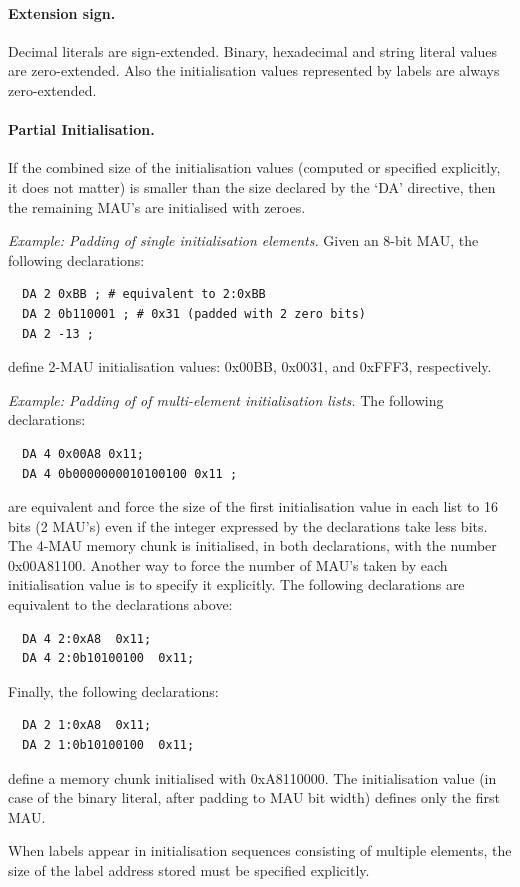 \documentclass[twoside]{tceusermanual}
\begin{document}
\paragraph{Extension sign.}
Decimal literals are sign-extended. Binary, hexadecimal and string literal
values are zero-extended. Also the initialisation values represented by
labels are always zero-extended.

\paragraph{Partial Initialisation.}
If the combined size of the initialisation values (computed or specified
explicitly, it does not matter) is smaller than the size declared by the `DA'
directive, then the remaining MAU's are initialised with zeroes.

\emph{Example: Padding of single initialisation elements.}
%
Given an 8-bit MAU, the following declarations:
\begin{verbatim}
  DA 2 0xBB ; # equivalent to 2:0xBB
  DA 2 0b110001 ; # 0x31 (padded with 2 zero bits)
  DA 2 -13 ;
\end{verbatim}
define 2-MAU initialisation values: 0x00BB, 0x0031, and 0xFFF3,
respectively.

\emph{Example: Padding of of multi-element initialisation lists.}
%
The following declarations:
\begin{verbatim}
  DA 4 0x00A8 0x11;
  DA 4 0b0000000010100100 0x11 ;
\end{verbatim}
are equivalent and force the size of the first initialisation value in each
list to 16 bits (2 MAU's) even if the integer expressed by the declarations
take less bits. The 4-MAU memory chunk is initialised, in both declarations,
with the number 0x00A81100.
%
Another way to force the number of MAU's taken by each initialisation value
is to specify it explicitly.
%
The following declarations are equivalent to the declarations above:
\begin{verbatim}
  DA 4 2:0xA8  0x11;
  DA 4 2:0b10100100  0x11;
\end{verbatim}
%
Finally, the following declarations:
\begin{verbatim}
  DA 2 1:0xA8  0x11;
  DA 2 1:0b10100100  0x11;
\end{verbatim}
define a memory chunk initialised with 0xA8110000. The initialisation value
(in case of the binary literal, after padding to MAU bit width) defines
only the first MAU.

When labels appear in initialisation sequences consisting of multiple
elements, the size of the label address stored must be specified explicitly.
\end{document}
